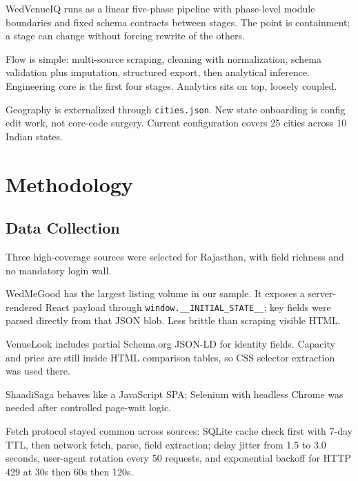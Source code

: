 \documentclass[conference]{IEEEtran}
\begin{document}
WedVenueIQ runs as a linear five-phase pipeline with phase-level module boundaries and fixed schema contracts between stages. The point is containment; a stage can change without forcing rewrite of the others.

Flow is simple: multi-source scraping, cleaning with normalization, schema validation plus imputation, structured export, then analytical inference. Engineering core is the first four stages. Analytics sits on top, loosely coupled.

Geography is externalized through \texttt{cities.json}. New state onboarding is config edit work, not core-code surgery. Current configuration covers 25 cities across 10 Indian states.

\section{Methodology}

\subsection{Data Collection}

Three high-coverage sources were selected for Rajasthan, with field richness and no mandatory login wall.

WedMeGood has the largest listing volume in our sample. It exposes a server-rendered React payload through \texttt{window.\_\_INITIAL\_STATE\_\_}; key fields were parsed directly from that JSON blob. Less brittle than scraping visible HTML.

VenueLook includes partial Schema.org JSON-LD for identity fields. Capacity and price are still inside HTML comparison tables, so CSS selector extraction was used there.

ShaadiSaga behaves like a JavaScript SPA; Selenium with headless Chrome was needed after controlled page-wait logic.

Fetch protocol stayed common across sources: SQLite cache check first with 7-day TTL, then network fetch, parse, field extraction; delay jitter from 1.5 to 3.0 seconds, user-agent rotation every 50 requests, and exponential backoff for HTTP 429 at 30s then 60s then 120s.
\end{document}
